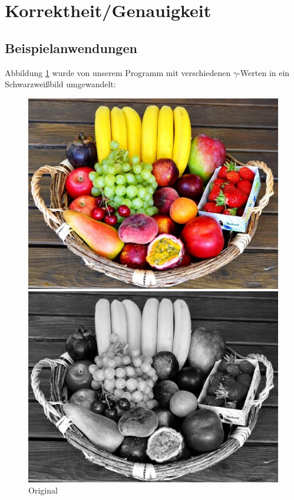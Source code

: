 \documentclass[course=erap]{aspdoc}
\begin{document}
	\section{Korrektheit/Genauigkeit}

	\subsection{Beispielanwendungen}
	Abbildung \ref{Obstkorb} wurde von unserem Programm mit verschiedenen $\gamma$-Werten in ein Schwarzweißbild umgewandelt:

	\begin{figure}[h]
		\begin{minipage}{0.49\linewidth}
			\centering
			\includegraphics[scale=1.2]{Images/fruit_basket_original.png}
			\caption{Original}
			\label{Obstkorb}
		\end{minipage}
		\centering
		\begin{minipage}{0.49\linewidth}
			\centering
			\includegraphics[scale=1.2]{Images/fruit_basket_gamma_1,25.png}

\end{minipage}
\end{figure}
\end{document}
